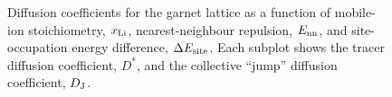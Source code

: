 \documentclass[aps,prb,twocolumn,superscriptaddress,reprint]{revtex4-1}
\newcommand{\xLi}{x_\m{Li}}
\begin{document}
\begin{figure}[tb]
  \centering
    \caption{\label{fig:diffusion_miniplots}Diffusion coefficients for the garnet lattice as a function of mobile-ion stoichiometry, $\xLi$, nearest-neighbour repulsion, $E_{\mathrm{nn}}$, and site-occupation energy difference, $\Delta E_{\mathrm{site}}$. Each subplot shows the tracer diffusion coefficient, $D^*$, and the collective ``jump'' diffusion coefficient, $D_{\mathrm{J}}$.}
\end{figure}
\end{document}
